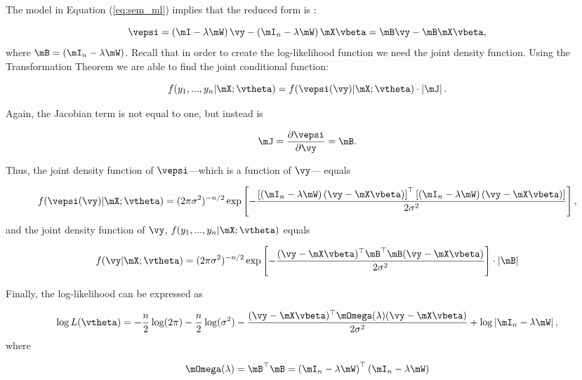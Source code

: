 \documentclass[english,12pt]{book}\usepackage[]{graphicx}\usepackage[]{xcolor}
\begin{document}
The model in Equation (\ref{eq:sem_ml}) implies that the reduced form is :

\begin{equation*}
\vepsi = \left(\mI-\lambda\mW\right)\vy - \left(\mI_n-\lambda\mW\right)\mX\vbeta = \mB\vy - \mB\mX\vbeta,
\end{equation*}
%
where $\mB = (\mI_n-\lambda\mW)$. Recall that in order to create the log-likelihood function we need the joint density function. Using the Transformation Theorem we are able to find the joint conditional function:

\begin{equation*}
  f(y_1,...,y_n|\mX; \vtheta) = f(\vepsi(\vy)| \mX ; \vtheta) \cdot \left|\mJ\right|.
\end{equation*}

Again, the Jacobian term is not equal to one, but instead is

\begin{equation*}
\mJ = \frac{\partial \vepsi}{\partial \vy} =\mB.
\end{equation*}

Thus, the joint density function of $\vepsi$---which is a function of $\vy$--- equals

\begin{equation*}
  f(\vepsi(\vy)| \mX ; \vtheta) = (2\pi \sigma^2)^{-n/2}\exp\left[- \frac{\left[\left(\mI_n-\lambda\mW\right)(\vy - \mX\vbeta)\right]^\top \left[\left(\mI_n-\lambda\mW\right)(\vy - \mX\vbeta)\right]}{2\sigma^2}\right],
\end{equation*}
%
and the joint density function of $\vy$, $f(y_1,...,y_n|\mX; \vtheta)$ equals

\begin{equation*}
  f(\vy| \mX ; \vtheta) = (2\pi \sigma^2)^{-n/2}\exp\left[- \frac{(\vy - \mX\vbeta)^\top \mB^\top \mB (\vy - \mX\vbeta)}{2\sigma^2}\right]\cdot \left|\mB\right|
\end{equation*}

Finally, the log-likelihood can be expressed as

\begin{equation}\label{eq:ll_sem}
\log L(\vtheta) = - \frac{n}{2}\log(2\pi) - \frac{n}{2}\log(\sigma^2)-\frac{(\vy - \mX\vbeta)^\top \mOmega(\lambda) (\vy - \mX\vbeta)}{2\sigma^2} + \log\left|\mI_n - \lambda \mW\right|,
\end{equation}
%
where 

\begin{equation*}
\mOmega(\lambda) = \mB^\top \mB = \left(\mI_n-\lambda\mW\right)^\top \left(\mI_n-\lambda\mW\right)
\end{equation*}
\end{document}
